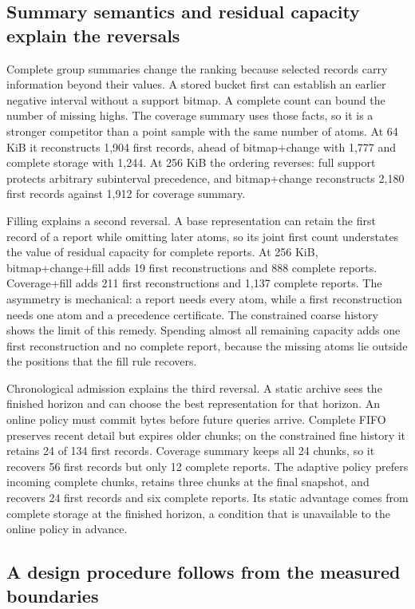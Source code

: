 \documentclass[a4paper,fleqn]{cas-dc}
\begin{document}
\subsection{Summary semantics and residual capacity explain the reversals}

Complete group summaries change the ranking because selected records carry information beyond their values. A stored bucket first can establish an earlier negative interval without a support bitmap. A complete count can bound the number of missing highs. The coverage summary uses those facts, so it is a stronger competitor than a point sample with the same number of atoms. At 64 KiB it reconstructs 1{,}904 first records, ahead of bitmap+change with 1{,}777 and complete storage with 1{,}244. At 256 KiB the ordering reverses: full support protects arbitrary subinterval precedence, and bitmap+change reconstructs 2{,}180 first records against 1{,}912 for coverage summary.

Filling explains a second reversal. A base representation can retain the first record of a report while omitting later atoms, so its joint first count understates the value of residual capacity for complete reports. At 256 KiB, bitmap+change+fill adds 19 first reconstructions and 888 complete reports. Coverage+fill adds 211 first reconstructions and 1{,}137 complete reports. The asymmetry is mechanical: a report needs every atom, while a first reconstruction needs one atom and a precedence certificate. The constrained coarse history shows the limit of this remedy. Spending almost all remaining capacity adds one first reconstruction and no complete report, because the missing atoms lie outside the positions that the fill rule recovers.

Chronological admission explains the third reversal. A static archive sees the finished horizon and can choose the best representation for that horizon. An online policy must commit bytes before future queries arrive. Complete FIFO preserves recent detail but expires older chunks; on the constrained fine history it retains 24 of 134 first records. Coverage summary keeps all 24 chunks, so it recovers 56 first records but only 12 complete reports. The adaptive policy prefers incoming complete chunks, retains three chunks at the final snapshot, and recovers 24 first records and six complete reports. Its static advantage comes from complete storage at the finished horizon, a condition that is unavailable to the online policy in advance.

\subsection{A design procedure follows from the measured boundaries}
\end{document}
